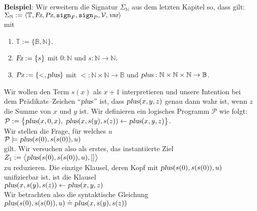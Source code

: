 \noindent
\textbf{Beispiel}: Wir erweitern die Signatur $\Sigma_\mathbb{N}$ aus dem letzten Kapitel so, dass gilt: \\[0.1cm]
\hspace*{1.3cm} 
\hspace*{1.3cm} $\Sigma_\mathbb{N} := \langle \mathbb{T}, \textsl{Fz}, \textsl{Pz}, \mathtt{sign}_{F}, \mathtt{sign}_{P}, \mathcal{V}, \textsl{var} \rangle$ \\[0.1cm]
mit
\begin{enumerate}
\item $\mathbb{T} := \{ \mathbb{B}, \mathbb{N} \}$.
\item $\textsl{Fz} := \{ s \}$ mit $0: \mathbb{N}$ und $s: \mathbb{N} \rightarrow \mathbb{N}$.
\item $\textsl{Pz} := \{ <, \textsl{plus} \}$ mit $<: \mathbb{N} \times \mathbb{N} \rightarrow \mathbb{B}$ und $\textsl{plus}: \mathbb{N} \times \mathbb{N} \times \mathbb{N} \rightarrow \mathbb{B}$.
\end{enumerate}
Wir wollen den Term $s(x)$ als $x+1$ interpretieren und
unsere Intention bei dem Pr\"{a}dikats--Zeichen ``$\textsl{plus}$'' ist, 
dass $\textsl{plus}(x,y,z)$ genau dann wahr ist, wenn $z$ die Summe von $x$ und $y$ ist.
Wir definieren ein logisches Programm $\mathcal{P}$ wie folgt: \\[0.1cm]
\hspace*{1.3cm} $\mathcal{P} := \big\{ \textsl{plus}(x,0,x),\; \textsl{plus}(x,s(y),s(z)) \leftarrow \textsl{plus}(x,y,z) \big\}$. \\[0.1cm]
Wir stellen die Frage, f\"{u}r welches $u$ \\[0.1cm]
\hspace*{1.3cm} $\mathcal{P} \models \textsl{plus}(s(0), s(s(0)), u)$ \\[0.1cm]
gilt.  Wir versuchen also als erstes, das instantiierte Ziel \\[0.1cm]
\hspace*{1.3cm} $Z_1 := \big\langle \textsl{plus}(s(0), s(s(0)), u), [] \big\rangle$ \\[0.1cm]
zu reduzieren.  Die einzige Klausel, deren Kopf mit $\textsl{plus}(s(0), s(s(0)), u)$ unifizierbar ist, ist die Klausel \\[0.1cm]
\hspace*{1.3cm} $\textsl{plus}(x,s(y),s(z)) \leftarrow \textsl{plus}(x,y,z)$ \\[0.1cm]
Wir betrachten also die syntaktische Gleichung \\[0.1cm]
\hspace*{1.3cm} $\textsl{plus}(s(0), s(s(0)), u) \doteq \textsl{plus}(x,s(y),s(z))$ \\[0.1cm]
